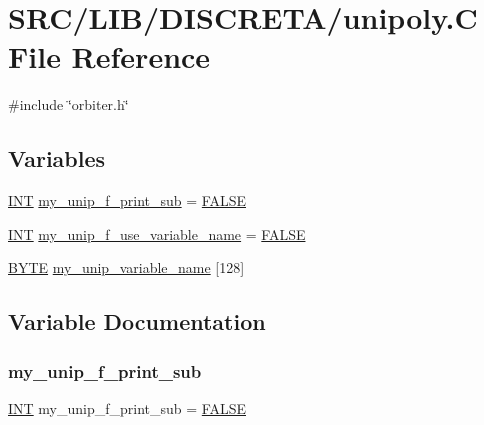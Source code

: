 \hypertarget{_d_i_s_c_r_e_t_a_2unipoly_8_c}{}\section{S\+R\+C/\+L\+I\+B/\+D\+I\+S\+C\+R\+E\+T\+A/unipoly.C File Reference}
\label{_d_i_s_c_r_e_t_a_2unipoly_8_c}
{\ttfamily \#include \char`\"{}orbiter.\+h\char`\"{}}\newline
\subsection*{Variables}
\begin{DoxyCompactItemize}
\item 
\mbox{\hyperlink{galois_8h_a09fddde158a3a20bd2dcadb609de11dc}{I\+NT}} \mbox{\hyperlink{_d_i_s_c_r_e_t_a_2unipoly_8_c_a8f9bf9f38c73cd49ecefd0d77e4d6edd}{my\+\_\+unip\+\_\+f\+\_\+print\+\_\+sub}} = \mbox{\hyperlink{nauty_8h_aa93f0eb578d23995850d61f7d61c55c1}{F\+A\+L\+SE}}
\item 
\mbox{\hyperlink{galois_8h_a09fddde158a3a20bd2dcadb609de11dc}{I\+NT}} \mbox{\hyperlink{_d_i_s_c_r_e_t_a_2unipoly_8_c_a2a3013302ec5db9009bba1904bb9fc27}{my\+\_\+unip\+\_\+f\+\_\+use\+\_\+variable\+\_\+name}} = \mbox{\hyperlink{nauty_8h_aa93f0eb578d23995850d61f7d61c55c1}{F\+A\+L\+SE}}
\item 
\mbox{\hyperlink{galois_8h_ab6cc7b4aeb6ea31aba2b3fbfc83ff5e6}{B\+Y\+TE}} \mbox{\hyperlink{_d_i_s_c_r_e_t_a_2unipoly_8_c_a5d6e4b8944879980ab03a9aafffda0d0}{my\+\_\+unip\+\_\+variable\+\_\+name}} \mbox{[}128\mbox{]}
\end{DoxyCompactItemize}


\subsection{Variable Documentation}
\mbox{\label{_d_i_s_c_r_e_t_a_2unipoly_8_c_a8f9bf9f38c73cd49ecefd0d77e4d6edd}} 
\subsubsection{\texorpdfstring{my\+\_\+unip\+\_\+f\+\_\+print\+\_\+sub}{my\_unip\_f\_print\_sub}}
{\footnotesize\ttfamily \mbox{\hyperlink{galois_8h_a09fddde158a3a20bd2dcadb609de11dc}{I\+NT}} my\+\_\+unip\+\_\+f\+\_\+print\+\_\+sub = \mbox{\hyperlink{nauty_8h_aa93f0eb578d23995850d61f7d61c55c1}{F\+A\+L\+SE}}}

